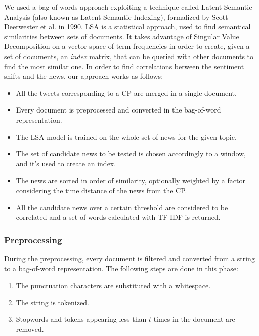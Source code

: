 We used a bag-of-words approach exploiting a technique called Latent Semantic Analysis (also known as Latent Semantic Indexing), formalized by Scott Deerwester et al. in 1990\cite{LSA}. LSA is a statistical approach, used to find semantical similarities between sets of documents. It takes advantage of Singular Value Decomposition on a vector space of term frequencies in order to create, given a set of documents, an \emph{index} matrix, that can be queried with other documents to find the most similar one. In order to find correlations between the sentiment shifts and the news, our approach works as follows:
\begin{itemize}
\item All the tweets corresponding to a CP are merged in a single document.
\item Every document is preprocessed and converted in the bag-of-word representation.
\item The LSA model is trained on the whole set of news for the given topic.
\item The set of candidate news to be tested is chosen accordingly to a window, and it's used to create an index.
\item The news are sorted in order of similarity, optionally weighted by a factor considering the time distance of the news from the CP.
\item All the candidate news over a certain threshold are considered to be correlated and a set of words calculated with TF-IDF is returned.
\end{itemize}

\subsubsection*{Preprocessing}
During the preprocessing, every document is filtered and converted from a string to a bag-of-word representation. The following steps are done in this phase:
\begin{enumerate}
\item The punctuation characters are substituted with a whitespace.
\item The string is tokenized.
\item Stopwords and tokens appearing less than $t$ times in the document are removed.
\end{enumerate}

